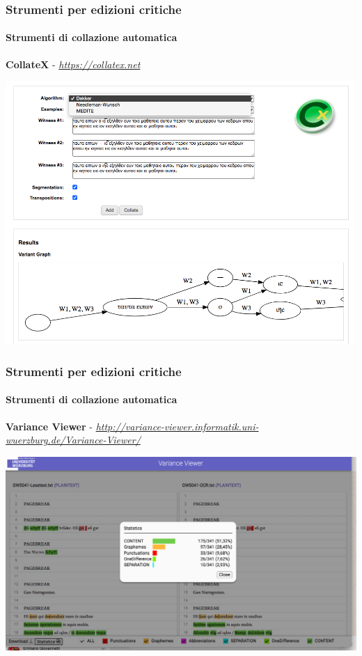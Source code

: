 \begin{frame}
    \frametitle{Strumenti per edizioni critiche}
    \framesubtitle{Strumenti di collazione automatica}
	\addtocounter{nframe}{1}
    \begin{center}
        \textbf{CollateX} - \textit{\url{https://collatex.net}}
    \end{center}

    \begin{center}
        \includegraphics[width=.85\textwidth]{imgs/collatex.png}
	\end{center}
\end{frame}

\begin{frame}
    \frametitle{Strumenti per edizioni critiche}
    \framesubtitle{Strumenti di collazione automatica}
	\addtocounter{nframe}{1}
    \begin{center}
        \textbf{Variance Viewer} - \textit{\url{http://variance-viewer.informatik.uni-wuerzburg.de/Variance-Viewer/}}
    \end{center}
    \begin{center}
        \includegraphics[width=.95\textwidth]{imgs/variance-viewer.png}
	\end{center}
\end{frame}

